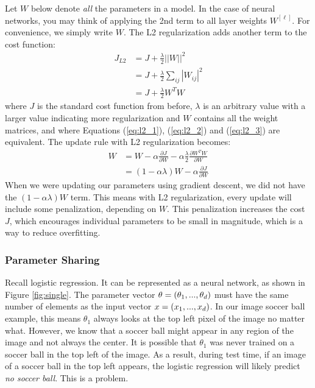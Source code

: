 \documentclass{article}
\numberwithin{equation}{section}
\begin{document}
Let $W$ below denote \textit{all} the parameters in a model. In the case of neural networks, you may think of applying the 2nd term to all layer weights $W^{[\ell]}$. For convenience, we simply write $W$. The L2 regularization adds another term to the cost function:
\begin{align}\label{eq:l2_1}
J_{L2} &= J + \frac{\lambda}{2} ||W||^2 \\ \label{eq:l2_2}
	   &= J + \frac{\lambda}{2} \sum\limits_{ij} | W_{ij} |^2 \\ \label{eq:l2_3}
	   &= J + \frac{\lambda}{2} W^T W 
\end{align}
where $J$ is the standard cost function from before, $\lambda$ is an arbitrary value with a larger value indicating more regularization and $W$ contains all the weight matrices, and where Equations (\ref{eq:l2_1}), (\ref{eq:l2_2}) and (\ref{eq:l2_3}) are equivalent. The update rule with L2 regularization becomes:
\begin{align}
W &= W - \alpha \frac{\partial J}{\partial W} - \alpha \frac{\lambda}{2} \frac{\partial W^T W}{\partial W} \\
&= (1 - \alpha \lambda) W - \alpha \frac{\partial J}{\partial W}
\end{align}
When we were updating our parameters using gradient descent, we did not have the $(1 - \alpha \lambda)W$ term.
This means with L2 regularization, every update will include some penalization, depending on $W$.
This penalization increases the cost $J$, which encourages individual parameters to be small in magnitude, which is a way to reduce overfitting.

\subsubsection{Parameter Sharing}

Recall logistic regression. It can be represented as a neural network, as shown in Figure \ref{fig:single}.
The parameter vector $\theta = (\theta_1, ..., \theta_{{d}})$ must have the same number of elements as the input vector $x = (x_1, ..., x_{{d}})$. In our image soccer ball example, this means $\theta_1$ always looks at the top left pixel of the image no matter what.
However, we know that a soccer ball might appear in any region of the image and not always the center.
It is possible that $\theta_1$ was never trained on a soccer ball in the top left of the image.
As a result, during test time, if an image of a soccer ball in the top left appears, the logistic regression will likely predict \textit{no soccer ball}. This is a problem.
\end{document}
